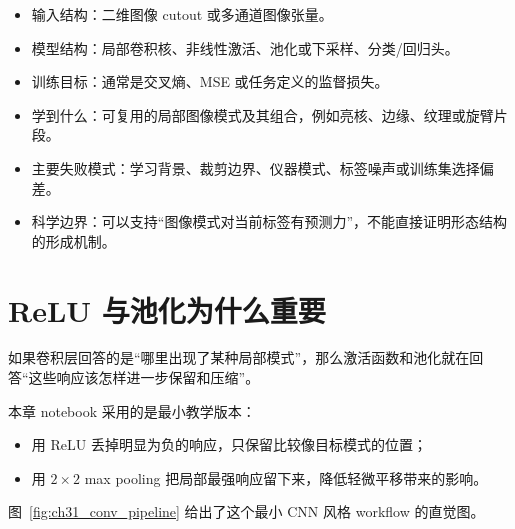 \begin{examplebox}
\begin{itemize}
    \item 输入结构：二维图像 cutout 或多通道图像张量。
    \item 模型结构：局部卷积核、非线性激活、池化或下采样、分类/回归头。
    \item 训练目标：通常是交叉熵、MSE 或任务定义的监督损失。
    \item 学到什么：可复用的局部图像模式及其组合，例如亮核、边缘、纹理或旋臂片段。
    \item 主要失败模式：学习背景、裁剪边界、仪器模式、标签噪声或训练集选择偏差。
    \item 科学边界：可以支持“图像模式对当前标签有预测力”，不能直接证明形态结构的形成机制。
\end{itemize}
\end{examplebox}

\section{ReLU 与池化为什么重要}

如果卷积层回答的是“哪里出现了某种局部模式”，那么激活函数和池化就在回答“这些响应该怎样进一步保留和压缩”。

本章 notebook 采用的是最小教学版本：

\begin{itemize}
    \item 用 ReLU 丢掉明显为负的响应，只保留比较像目标模式的位置；
    \item 用 \(2\times 2\) max pooling 把局部最强响应留下来，降低轻微平移带来的影响。
\end{itemize}

图~\ref{fig:ch31_conv_pipeline} 给出了这个最小 CNN 风格 workflow 的直觉图。

